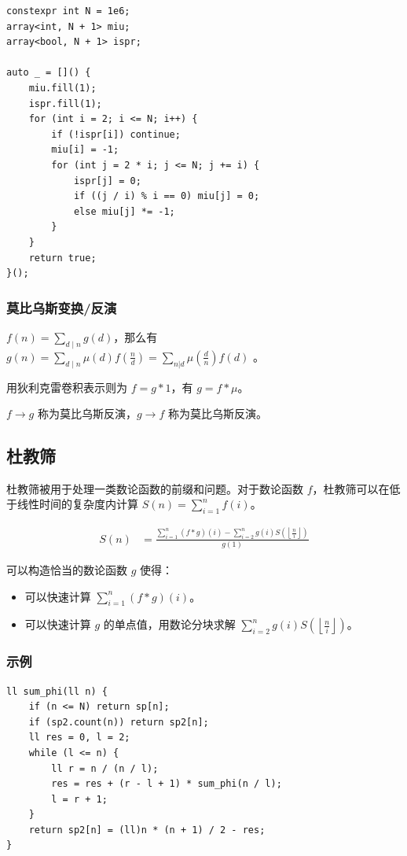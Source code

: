 \documentclass[UTF8, twoside]{ctexart}
\begin{document}
\begin{sloppypar}
\begin{lstlisting}[style=cpp]
constexpr int N = 1e6;
array<int, N + 1> miu;
array<bool, N + 1> ispr;

auto _ = []() {
    miu.fill(1);
    ispr.fill(1);
    for (int i = 2; i <= N; i++) {
        if (!ispr[i]) continue;
        miu[i] = -1;
        for (int j = 2 * i; j <= N; j += i) {
            ispr[j] = 0;
            if ((j / i) % i == 0) miu[j] = 0;
            else miu[j] *= -1;
        }
    }
    return true;
}();
\end{lstlisting}

\subsubsection{莫比乌斯变换/反演}

$f(n)=\sum_{d\mid n}g(d)$，那么有 $g(n)=\sum_{d\mid n}\mu(d)f(\frac{n}{d})=\sum_{n|d}\mu(\frac{d}{n})f(d)$
。

用狄利克雷卷积表示则为 $f=g\ast1$，有 $g=f\ast\mu$。

$f \rightarrow g$ 称为莫比乌斯反演，$g \rightarrow f$ 称为莫比乌斯反演。

\subsection{杜教筛}

杜教筛被用于处理一类数论函数的前缀和问题。对于数论函数 $f$，杜教筛可以在低于线性时间的复杂度内计算 $S(n)=\sum_{i=1}^{n}f(i)$。

$$
\begin{aligned}
    S(n) & = \frac{\sum_{i=1}^n (f * g)(i) - \sum_{i=2}^n g(i)S\left(\left\lfloor\frac{n}{i}\right\rfloor\right)}{g(1)}
\end{aligned}
$$

可以构造恰当的数论函数 $g$ 使得：

\begin{itemize}
   \item 可以快速计算 $\sum_{i=1}^n(f * g)(i)$。
   \item 可以快速计算 $g$ 的单点值，用数论分块求解 $\sum_{i=2}^ng(i)S\left(\left\lfloor\frac{n}{i}\right\rfloor\right)$。
\end{itemize}

\subsubsection{示例}

\begin{lstlisting}[style=cpp]
ll sum_phi(ll n) {
    if (n <= N) return sp[n];
    if (sp2.count(n)) return sp2[n];
    ll res = 0, l = 2;
    while (l <= n) {
        ll r = n / (n / l);
        res = res + (r - l + 1) * sum_phi(n / l);
        l = r + 1;
    }
    return sp2[n] = (ll)n * (n + 1) / 2 - res;
}


\end{lstlisting}
\end{sloppypar}
\end{document}
